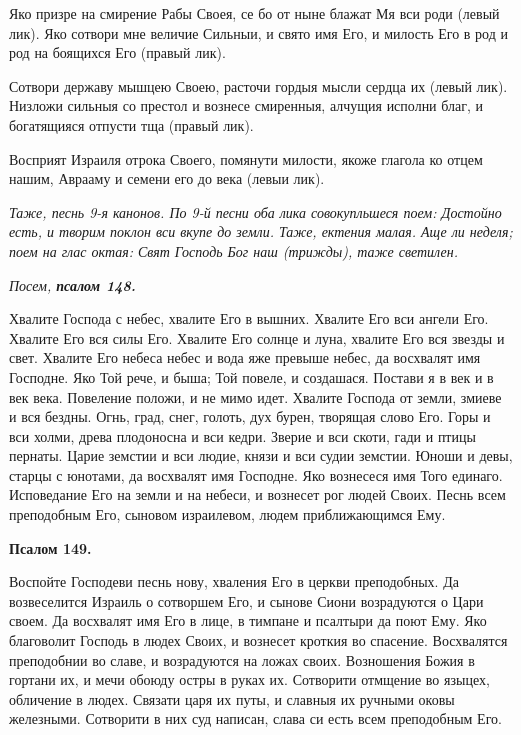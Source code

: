 Яко призре на смирение Рабы Своея, се бо от ныне блажат Мя вси роди (левый лик). Яко сотвори мне величие Сильныи, и свято имя Его, и милость Его в род и род на боящихся Его (правый лик). 

Сотвори державу мышцею Своею, расточи гордыя мысли сердца их (левый лик). Низложи сильныя со престол и вознесе смиренныя, алчущия исполни благ, и богатящияся отпусти тща (правый лик). 

Восприят Израиля отрока Своего, помянути милости, якоже глагола ко отцем нашим, Аврааму и семени его до века (левыи лик).


\itshape Таже, песнь 9-я канонов. По 9-й песни оба лика совокупльшеся поем:\normalfont{} Достойно есть, и творим поклон вси вкупе до земли. Таже, ектения малая. Аще ли неделя; поем на глас октая: Свят Господь Бог наш (трижды), таже светилен.


\medskip


\itshape Посем, \bfseries псалом 148\normalfont{}.\normalfont{}


Хвалите Господа с небес, хвалите Его в вышних. Хвалите Его вси ангели Его. Хвалите Его вся силы Его. Хвалите Его солнце и луна, хвалите Его вся звезды и свет. Хвалите Его небеса небес и вода яже превыше небес, да восхвалят имя Господне. Яко Той рече, и быша; Той повеле, и создашася. Постави я в век и в век века. Повеление положи, и не мимо идет. Хвалите Господа от земли, змиеве и вся бездны. Огнь, град, снег, голоть, дух бурен, творящая слово Его. Горы и вси холми, древа плодоносна и вси кедри. Зверие и вси скоти, гади и птицы пернаты. Царие земстии и вси людие, князи и вси судии земстии. Юноши и девы, старцы с юнотами, да восхвалят имя Господне. Яко вознесеся имя Того единаго. Исповедание Его на земли и на небеси, и вознесет рог людей Своих. Песнь всем преподобным Его, сыновом израилевом, людем приближающимся Ему.


\medskip


\bfseries Псалом 149.\normalfont{}


Воспойте Господеви песнь нову, хваления Его в церкви преподобных. Да возвеселится Израиль о сотворшем Его, и сынове Сиони возрадуются о Цари своем. Да восхвалят имя Его в лице, в тимпане и псалтыри да поют Ему. Яко благоволит Господь в людех Своих, и вознесет кроткия во спасение. Восхвалятся преподобнии во славе, и возрадуются на ложах своих. Возношения Божия в гортани их, и мечи обоюду остры в руках их. Сотворити отмщение во языцех, обличение в людех. Связати царя их путы, и славныя их ручными оковы железными. Сотворити в них суд написан, слава си есть всем преподобным Его.


